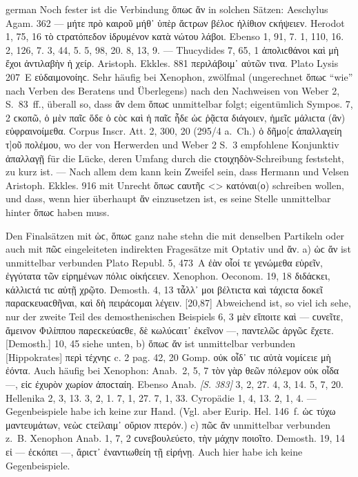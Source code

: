 \begin{otherlanguage*}{german}
Noch fester ist die Verbindung ὅπωϲ ἄν in solchen Sätzen: Aeschylus Agam. 362  — μήτε πρὸ καιροῦ μήθ᾽ ὑπὲρ ἄϲτρων βέλοϲ ἠλίθιον ϲκήψειεν. Herodot 1, 75, 16  τὸ ϲτρατόπεδον ἱδρυμένον κατὰ νώτου λάβοι. Ebenso 1, 91, 7. 1, 110, 16. 2, 126, 7. 3, 44, 5. 5, 98, 20. 8, 13, 9. — Thucydides 7, 65, 1  ἀπολιϲθάνοι καὶ μὴ ἔχοι ἀντιλαβὴν ἡ χείρ. Aristoph. Ekkles. 881  περιλάβοιμ᾽ αὐτῶν τινα. Plato Lysis 207~Ε  εὐδαιμονοίηϲ. Sehr häufig bei Xenophon, zwölfmal (ungerechnet ὅπωϲ “wie” nach Verben des Beratens und Überlegens) nach den Nachweisen von Weber 2, S.~83~ff., überall so, dass ἄν dem ὅπωϲ unmittelbar folgt; eigentümlich Sympos. 7, 2 ϲκοπῶ,  ὁ μὲν παῖϲ ὅδε ὁ ϲὸϲ καὶ ἡ παῖϲ ἧδε ὡϲ ῥᾷϲτα διάγοιεν, ἡμεῖϲ  μάλιϲτα (ἂν) εὐφραινοίμεθα. Corpus Inscr. Att. 2, 300, 20 (295/4 a.~Ch.)  ὁ δῆμο[ϲ ἀπαλλαγείη τ]οῦ πολέμου, wo der von Herwerden und Weber 2 S.~3 empfohlene Konjunktiv ἀπαλλαγῇ für die Lücke, deren Umfang durch die ϲτοιχηδὸν-Schreibung feststeht, zu kurz ist. — Nach allem dem kann kein Zweifel sein, dass Hermann und Velsen Aristoph. Ekkles. 916 mit Unrecht ὅπωϲ ϲαυτῆϲ <> κατόναι(ο) schreiben wollen, und dass, wenn hier überhaupt ἄν einzusetzen ist, es seine Stelle unmittelbar hinter ὅπωϲ haben muss.

Den Finalsätzen mit ὡϲ, ὅπωϲ ganz nahe stehn die mit denselben Partikeln oder auch mit πῶϲ eingeleiteten indirekten Fragesätze mit Optativ und ἄν. a) ὡϲ ἄν ist unmittelbar verbunden Plato Republ. 5, 473~A ἐὰν οἷοί τε γενώμεθα εὑρεῖν,  ἐγγύτατα τῶν εἰρημένων πόλιϲ οἰκήϲειεν. Xenophon. Oeconom. 19, 18 διδάϲκει,  κάλλιϲτά τιϲ αὐτῇ χρῷτο. Demosth. 4, 13 τἆλλ᾽  μοι βέλτιϲτα καὶ τάχιϲτα δοκεῖ παραϲκευαϲθῆναι, καὶ δὴ πειράϲομαι λέγειν. [20,87] Abweichend ist, so viel ich sehe, nur der zweite Teil des demosthenischen Beispiels 6, 3  μὲν  εἴποιτε καὶ — ϲυνεῖτε, ἄμεινον Φιλίππου παρεϲκεύαϲθε,  δὲ κωλύϲαιτ᾽  ἐκεῖνον —, παντελῶϲ ἀργῶϲ ἔχετε. [Demosth.] 10, 45 siehe unten, b) ὅπωϲ ἄν ist unmittelbar verbunden [Hippokrates] περὶ τέχνηϲ c. 2 pag. 42, 20 Gomp. οὐκ οἶδ᾽  τιϲ αὐτὰ νομίϲειε μὴ ἐόντα. Auch häufig bei Xenophon: Anab.~2, 5, 7 τὸν γὰρ θεῶν πόλεμον οὐκ οἶδα —,  εἰϲ ἐχυρὸν χωρίον ἀποϲταίη. Ebenso Anab. \hypertarget{p383}{\emph{[S. 383]}}\label{p383} 3, 2, 27. 4, 3, 14. 5, 7, 20. Hellenika 2, 3, 13. 3, 2, 1. 7, 1, 27. 7, 1, 33. Cyropädie 1, 4, 13. 2, 1, 4. — Gegenbeispiele habe ich keine zur Hand. (Vgl. aber Eurip. Hel. 146~f. ὡϲ τύχω μαντευμάτων,  νεὼϲ ϲτείλαιμ᾽  οὔριον πτερόν.) c) πῶϲ ἄν unmittelbar verbunden z.~B. Xenophon Anab. 1, 7, 2 ϲυνεβουλεύετο,  τὴν μάχην ποιοῖτο. Demosth. 19, 14 εἰ — ἐϲκόπει —,  ἄριϲτ᾽ ἐναντιωθείη τῇ εἰρήνῃ. Auch hier habe ich keine Gegenbeispiele.


\end{otherlanguage*}
